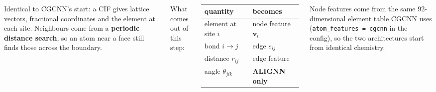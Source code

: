 \begin{frame}

\begin{columns}[T]
{\sffamily\footnotesize
Identical to CGCNN's start: a CIF gives lattice vectors, fractional coordinates
and the element at each site. Neighbours come from a \textbf{periodic distance
search}, so an atom near a face still finds those across the boundary.}

\vspace{5pt}

{\sffamily\footnotesize\color{Muted} What comes out of this step:}\\[3pt]
\begin{tabular}{@{}ll@{}}
\toprule
\footnotesize quantity & \footnotesize becomes \\
\midrule
\footnotesize element at site $i$ & \footnotesize node feature $\mathbf{v}_i$ \\
\footnotesize bond $i \rightarrow j$ & \footnotesize edge $e_{ij}$ \\
\footnotesize distance $r_{ij}$ & \footnotesize edge feature \\
\footnotesize angle $\theta_{jik}$ & \footnotesize \textbf{ALIGNN only} \\
\bottomrule
\end{tabular}

\vspace{6pt}
{\sffamily\footnotesize
Node features come from the same 92-dimensional element table CGCNN uses
(\texttt{atom\_features = cgcnn} in the config), so the two architectures start
from identical chemistry.}
\end{columns}
\end{frame}

